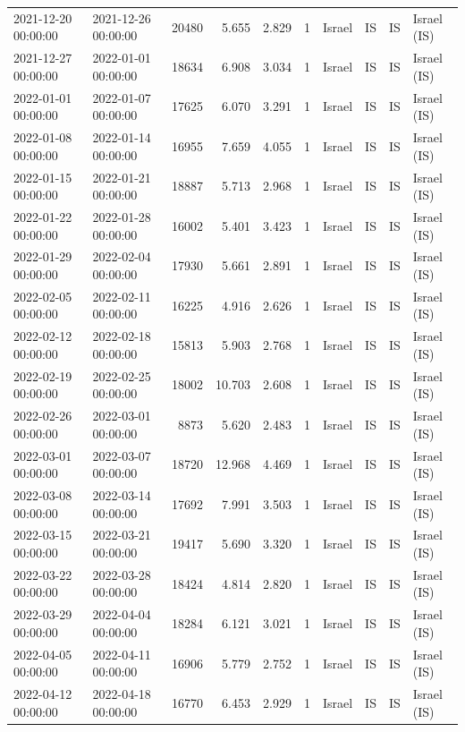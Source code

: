 \begin{tabular}{llrrrlllll}
2021-12-20 00:00:00 & 2021-12-26 00:00:00 & 20480 & 5.655 & 2.829 & 1 & Israel & IS & IS & Israel (IS) \\
2021-12-27 00:00:00 & 2022-01-01 00:00:00 & 18634 & 6.908 & 3.034 & 1 & Israel & IS & IS & Israel (IS) \\
2022-01-01 00:00:00 & 2022-01-07 00:00:00 & 17625 & 6.070 & 3.291 & 1 & Israel & IS & IS & Israel (IS) \\
2022-01-08 00:00:00 & 2022-01-14 00:00:00 & 16955 & 7.659 & 4.055 & 1 & Israel & IS & IS & Israel (IS) \\
2022-01-15 00:00:00 & 2022-01-21 00:00:00 & 18887 & 5.713 & 2.968 & 1 & Israel & IS & IS & Israel (IS) \\
2022-01-22 00:00:00 & 2022-01-28 00:00:00 & 16002 & 5.401 & 3.423 & 1 & Israel & IS & IS & Israel (IS) \\
2022-01-29 00:00:00 & 2022-02-04 00:00:00 & 17930 & 5.661 & 2.891 & 1 & Israel & IS & IS & Israel (IS) \\
2022-02-05 00:00:00 & 2022-02-11 00:00:00 & 16225 & 4.916 & 2.626 & 1 & Israel & IS & IS & Israel (IS) \\
2022-02-12 00:00:00 & 2022-02-18 00:00:00 & 15813 & 5.903 & 2.768 & 1 & Israel & IS & IS & Israel (IS) \\
2022-02-19 00:00:00 & 2022-02-25 00:00:00 & 18002 & 10.703 & 2.608 & 1 & Israel & IS & IS & Israel (IS) \\
2022-02-26 00:00:00 & 2022-03-01 00:00:00 & 8873 & 5.620 & 2.483 & 1 & Israel & IS & IS & Israel (IS) \\
2022-03-01 00:00:00 & 2022-03-07 00:00:00 & 18720 & 12.968 & 4.469 & 1 & Israel & IS & IS & Israel (IS) \\
2022-03-08 00:00:00 & 2022-03-14 00:00:00 & 17692 & 7.991 & 3.503 & 1 & Israel & IS & IS & Israel (IS) \\
2022-03-15 00:00:00 & 2022-03-21 00:00:00 & 19417 & 5.690 & 3.320 & 1 & Israel & IS & IS & Israel (IS) \\
2022-03-22 00:00:00 & 2022-03-28 00:00:00 & 18424 & 4.814 & 2.820 & 1 & Israel & IS & IS & Israel (IS) \\
2022-03-29 00:00:00 & 2022-04-04 00:00:00 & 18284 & 6.121 & 3.021 & 1 & Israel & IS & IS & Israel (IS) \\
2022-04-05 00:00:00 & 2022-04-11 00:00:00 & 16906 & 5.779 & 2.752 & 1 & Israel & IS & IS & Israel (IS) \\
2022-04-12 00:00:00 & 2022-04-18 00:00:00 & 16770 & 6.453 & 2.929 & 1 & Israel & IS & IS & Israel (IS) \\

\end{tabular}
